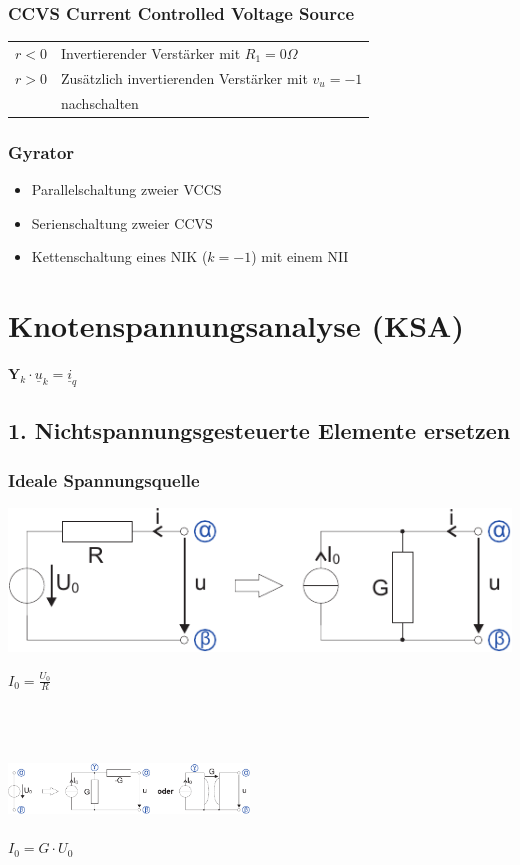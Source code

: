 \documentclass[a4paper,twocolumn,10pt]{article}
\begin{document}
\subsubsection*{CCVS Current Controlled Voltage Source}
\begin{tabular}{ll}
$r<0$ & Invertierender Verstärker mit $R_1=0\Omega$\\
$r>0$ & Zusätzlich invertierenden Verstärker mit $v_u=-1$\\
& nachschalten
\end{tabular}

\subsubsection*{Gyrator}
\begin{itemize}[label=- ,leftmargin=5mm]
	\item Parallelschaltung zweier VCCS
	\item Serienschaltung zweier CCVS
	\item Kettenschaltung eines NIK ($k=-1$) mit einem NII
\end{itemize}

\section*{Knotenspannungsanalyse (KSA)}
$\textbf{Y}_k\cdot \underline{u}_k=\underline{i}_q$

\subsection*{1. Nichtspannungsgesteuerte Elemente ersetzen}
\subsubsection*{Ideale Spannungsquelle}
\begin{minipage}[b]{0.35\textwidth}
\includegraphics[width=\textwidth]{img/KSA_Quellwandlung}
\end{minipage}
\hfill
\begin{minipage}[b]{0.1\textwidth}
$I_0=\frac{U_0}{R}$\\\\
\end{minipage}\\\\
\includegraphics[width=0.48\textwidth]{img/KSA_Quellwandlung2}\\\\
$I_0=G\cdot U_0$
\end{document}
